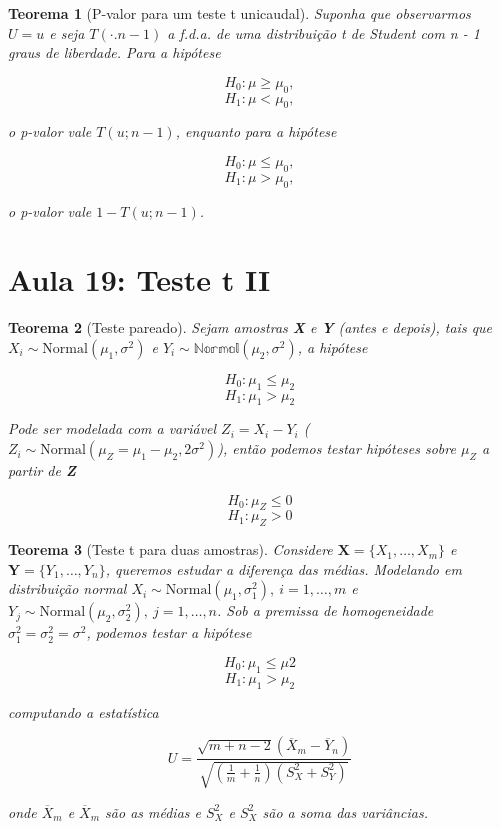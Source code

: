 \documentclass{article}
\newtheorem{theorem}{Teorema}
\begin{document}
\begin{theorem}[P-valor para um teste t unicaudal]
Suponha que observarmos $U = u$ e seja $T(\cdot. n - 1)$ a f.d.a. de uma distribuição t de Student com n - 1 graus de liberdade. Para a hipótese

$$H_0 : \mu \geq \mu_0,$$
$$H_1 : \mu < \mu_0,$$

o p-valor vale $T(u; n-1)$, enquanto para a hipótese

$$H_0 : \mu \leq \mu_0,$$
$$H_1 : \mu > \mu_0,$$

o p-valor vale $1 - T(u; n-1)$.
\end{theorem}

\section*{Aula 19: Teste t II}\label{s19}
\begin{theorem}[Teste pareado]
Sejam amostras \textbf{X} e \textbf{Y} (antes e depois), tais que $X_i \sim \mathrm{Normal}(\mu_1, \sigma^2)$ e $Y_i \sim \mathbb{Normal}(\mu_2, \sigma^2)$, a hipótese

$$H_0 : \mu_1 \leq \mu_2$$
$$H_1 : \mu_1 > \mu_2$$

Pode ser modelada com a variável $Z_i = X_i - Y_i$ ($Z_i \sim \mathrm{Normal}(\mu_Z = \mu_1 - \mu_2, 2 \sigma^2)$), então podemos testar hipóteses sobre $\mu_Z$ a partir de \textbf{Z}

$$H_0 : \mu_Z \leq 0$$
$$H_1 : \mu_Z > 0$$
\end{theorem}

\begin{theorem}[Teste t para duas amostras]
Considere $\textbf{X} = \{ X_1, \ldots, X_m \}$ e $\textbf{Y} = \{ Y_1, \ldots, Y_n \}$, queremos estudar a diferença das médias. Modelando em distribuição normal $X_i \sim \mathrm{Normal}(\mu_1, \sigma_1^2), \ i = 1, \ldots, m$ e $Y_j \sim \mathrm{Normal}(\mu_2, \sigma_2^2), \ j = 1, \ldots, n$. Sob a premissa de homogeneidade $\sigma_1^2 = \sigma_2^2 = \sigma^2$, podemos testar a hipótese

$$H_0 : \mu_1 \leq \mu2$$
$$H_1 : \mu_1 > \mu_2$$

computando a estatística

$$U = \frac{\sqrt{m + n - 2} (\overline{X}_m - \overline{Y}_n)}{\sqrt{(\frac{1}{m} + \frac{1}{n})(S_X^2 + S_Y^2)}}$$

onde $\overline{X}_m$ e $\overline{X}_m$ são as médias e $S_X^2$ e $S_X^2$ são a soma das variâncias.
\end{theorem}
\end{document}
